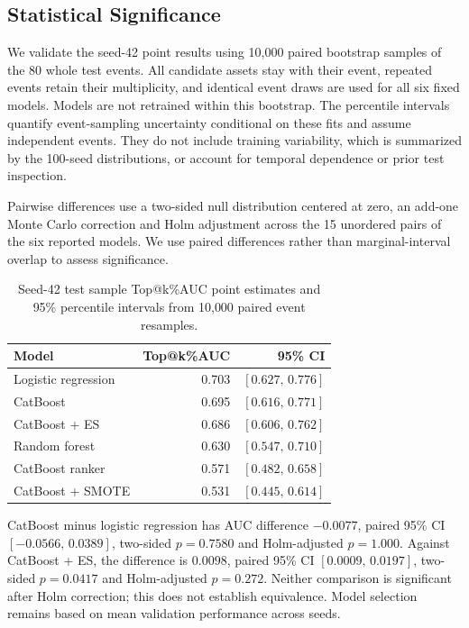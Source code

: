 \documentclass{ieeeaccess}
\begin{document}
\subsection{Statistical Significance}
\label{sec:significance}
We validate the seed-42 point results using 10{,}000 paired bootstrap samples of the 80 whole test events. All candidate assets stay with their event, repeated events retain their multiplicity, and identical event draws are used for all six fixed models. Models are not retrained within this bootstrap. The percentile intervals quantify event-sampling uncertainty conditional on these fits and assume independent events. They do not include training variability, which is summarized by the 100-seed distributions, or account for temporal dependence or prior test inspection.

Pairwise differences use a two-sided null distribution centered at zero, an add-one Monte Carlo correction and Holm adjustment across the 15 unordered pairs of the six reported models. We use paired differences rather than marginal-interval overlap to assess significance.

\begin{table}[!tbp]
    \centering
    \small
    \setlength{\tabcolsep}{5pt}
    \renewcommand{\arraystretch}{1.15}
    \caption{Seed-42 test sample Top@k\%AUC point estimates and 95\% percentile intervals from 10{,}000 paired event resamples.}
    \begin{tabular}{lrr}
        \toprule
        Model & Top@k\%AUC & 95\% CI \\
        \midrule
        Logistic regression & 0.703 & $[0.627,\,0.776]$ \\
        CatBoost & 0.695 & $[0.616,\,0.771]$ \\
        CatBoost + ES & 0.686 & $[0.606,\,0.762]$ \\
        Random forest & 0.630 & $[0.547,\,0.710]$ \\
        CatBoost ranker & 0.571 & $[0.482,\,0.658]$ \\
        CatBoost + SMOTE & 0.531 & $[0.445,\,0.614]$ \\
        \bottomrule
    \end{tabular}
    \label{table:significance_ci}
\end{table}

CatBoost minus logistic regression has AUC difference $-0.0077$, paired 95\% CI $[-0.0566,\,0.0389]$, two-sided $p=0.7580$ and Holm-adjusted $p=1.000$. Against CatBoost + ES, the difference is $0.0098$, paired 95\% CI $[0.0009,\,0.0197]$, two-sided $p=0.0417$ and Holm-adjusted $p=0.272$. Neither comparison is significant after Holm correction; this does not establish equivalence. Model selection remains based on mean validation performance across seeds.
\end{document}
